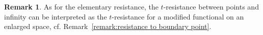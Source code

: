 \documentclass[a4paper,11pt,reqno]{amsart}
\theoremstyle{definition}
\newtheorem{remark}[lemma]{Remark}
\numberwithin{equation}{section}
\newcommand{\cR}{{\mathcal R}}
\newcommand{\cE}{{\mathcal E}}
\newcommand{\cF}{{\mathcal F}}
\newcommand{\av}[1]{\left\Vert #1\right\Vert}
\newcommand{\1}{\mathds{1}}
\begin{document}
\begin{remark}
 As for the elementary resistance, the $t$-resistance between points and infinity can be interpreted as the $t$-resistance for a modified functional on an enlarged space, cf. Remark~\ref{remark:resistance to boundary point}.
\end{remark}


% 
%  
%  
%  
\end{document}
